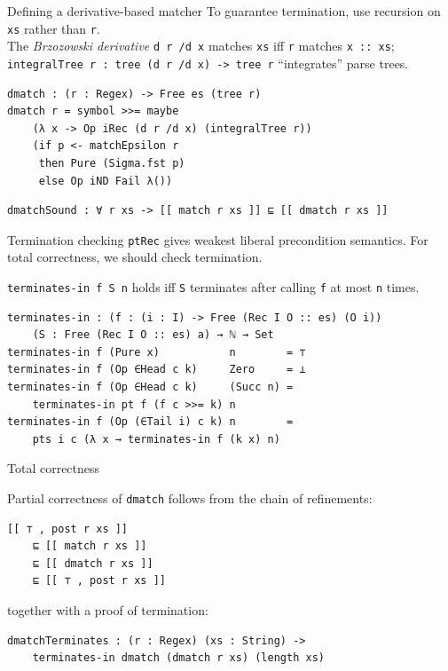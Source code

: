 \documentclass[ignorenonframetext,]{beamer}
\newcommand{\Agda}[1]{\texttt{#1}\xspace}
\begin{document}
\begin{frame}[fragile]{Defining a derivative-based matcher}
To guarantee termination, use recursion on \Agda{xs} rather than \Agda{r}.\\
The \emph{Brzozowski derivative} \Agda{d r /d x} matches \Agda{xs} iff \Agda{r} matches \Agda{x :: xs};\\ \Agda{integralTree r : tree (d r /d x) -> tree r} ``integrates'' parse trees.

\begin{verbatim}
dmatch : (r : Regex) -> Free es (tree r)
dmatch r = symbol >>= maybe
    (λ x -> Op iRec (d r /d x) (integralTree r))
    (if p <- matchEpsilon r
     then Pure (Sigma.fst p)
     else Op iND Fail λ())
\end{verbatim}

\pause

\begin{verbatim}
dmatchSound : ∀ r xs -> [[ match r xs ]] ⊑ [[ dmatch r xs ]]
\end{verbatim}
\end{frame}

\begin{frame}[fragile]{Termination checking}
\Agda{ptRec} gives weakest liberal precondition semantics.
For total correctness, we should check termination.

\Agda{terminates-in f S n} holds iff \Agda{S} terminates after calling \Agda{f} at most \Agda{n} times.

\begin{verbatim}
terminates-in : (f : (i : I) -> Free (Rec I O :: es) (O i))
    (S : Free (Rec I O :: es) a) → ℕ → Set
terminates-in f (Pure x)           n        = ⊤
terminates-in f (Op ∈Head c k)     Zero     = ⊥
terminates-in f (Op ∈Head c k)     (Succ n) =
    terminates-in pt f (f c >>= k) n
terminates-in f (Op (∈Tail i) c k) n        =
    pts i c (λ x → terminates-in f (k x) n)
\end{verbatim}
\end{frame}

\begin{frame}[fragile]{Total correctness}

Partial correctness of \Agda{dmatch} follows from the chain of refinements:
\begin{verbatim}
[[ ⊤ , post r xs ]]
    ⊑ [[ match r xs ]]
    ⊑ [[ dmatch r xs ]]
    ⊑ [[ ⊤ , post r xs ]]
\end{verbatim}
together with a proof of termination:
\begin{verbatim}
dmatchTerminates : (r : Regex) (xs : String) ->
    terminates-in dmatch (dmatch r xs) (length xs)
\end{verbatim}

\end{frame}
\end{document}
